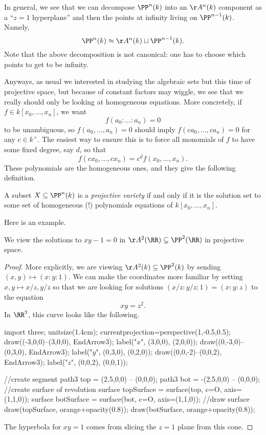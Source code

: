 \documentclass[../notes.tex]{subfiles}
\begin{document}
In general, we see that we can decompose $\PP^n(k)$ into an $\AA^n(k)$ component as a ``$z=1$ hyperplane'' and then the points at infinity living on $\PP^{n-1}(k)$. Namely,
\[\PP^n(k)\approx\AA^n(k)\sqcup\PP^{n-1}(k).\]
Note that the above decomposition is not canonical: one has to choose which points to get to be infinity.

Anyways, as usual we interested in studying the algebraic sets but this time of projective space, but because of constant factors may wiggle, we see that we really should only be looking at homogeneous equations. More concretely, if $f\in k[x_0,\ldots,x_n]$, we want
\[f(a_0:\ldots:a_n)=0\]
to be unambiguous, so $f(a_0,\ldots,a_n)=0$ should imply $f(ca_0,\ldots,ca_n)=0$ for any $c\in k^\times$. The easiest way to ensure this is to force all monomials of $f$ to have some fixed degree, say $d$, so that
\[f(cx_0,\ldots,cx_n)=c^df(x_0,\ldots,x_n).\]
These polynomials are the homogeneous ones, and they give the following definition.
\begin{definition}
	A subset $X\subseteq\PP^n(k)$ is a \textit{projective variety} if and only if it is the solution set to some set of homogeneous (!) polynomials equations of $k[x_0,\ldots,x_n]$.
\end{definition}
Here is an example.
\begin{exe}
	We view the solutions to $xy-1=0$ in $\AA^2(\RR)\subseteq\PP^2(\RR)$ in projective space.
\end{exe}
\begin{proof}
	More explicitly, we are viewing $\AA^2(k)\subseteq\PP^2(k)$ by sending $(x,y)\mapsto(x:y:1)$. We can make the coordinates more familiar by setting $x,y\mapsto x/z,y/z$ so that we are looking for solutions $(x/z:y/z:1)=(x:y:z)$ to the equation
	\[xy=z^2.\]
	In $\RR^3$, this curve looks like the following.
	\begin{center}
		\begin{asy}
			import three;
			unitsize(1.4cm);
			currentprojection=perspective(1,-0.5,0.5);
			draw((-3,0,0)--(3,0,0), EndArrow3);
			label("$x$", (3,0,0), (2,0,0));
			draw((0,-3,0)--(0,3,0), EndArrow3);
			label("$y$", (0,3,0), (0,2,0));
			draw((0,0,-2)--(0,0,2), EndArrow3);
			label("$z$", (0,0,2), (0,0,1));
			
			//create segment
			path3 top = (2.5,0,0) -- (0,0,0);
			path3 bot = -(2.5,0,0) -- (0,0,0);
			//create surface of revolution
			surface topSurface = surface(top, c=O, axis=(1,1,0));
			surface botSurface = surface(bot, c=O, axis=(1,1,0));
			//draw surface
			draw(topSurface, orange+opacity(0.8));
			draw(botSurface, orange+opacity(0.8));
		\end{asy}
	\end{center}
	The hyperbola for $xy=1$ comes from slicing the $z=1$ plane from this cone.
\end{proof}
\end{document}
